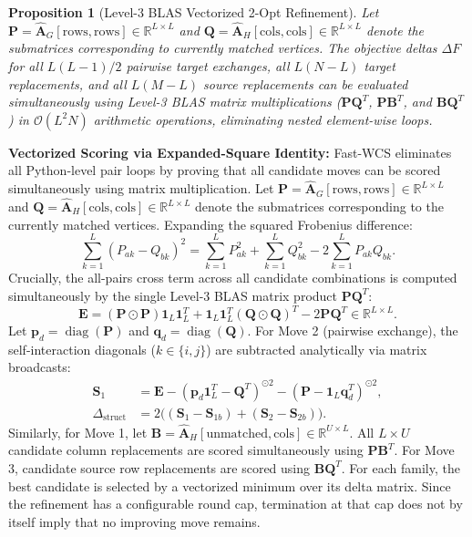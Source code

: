 \documentclass[conference]{IEEEtran}
\newtheorem{proposition}{Proposition}
\begin{document}
\begin{proposition}[Level-3 BLAS Vectorized 2-Opt Refinement]
\label{prop:2opt}
Let $\mathbf{P} = \hat{\mathbf{A}}_G[\mathrm{rows}, \mathrm{rows}] \in \mathbb{R}^{L \times L}$ and $\mathbf{Q} = \hat{\mathbf{A}}_H[\mathrm{cols}, \mathrm{cols}] \in \mathbb{R}^{L \times L}$ denote the submatrices corresponding to currently matched vertices. The objective deltas $\Delta F$ for all $L(L-1)/2$ pairwise target exchanges, all $L(N-L)$ target replacements, and all $L(M-L)$ source replacements can be evaluated simultaneously using Level-3 BLAS matrix multiplications ($\mathbf{P}\mathbf{Q}^T$, $\mathbf{P}\mathbf{B}^T$, and $\mathbf{B}\mathbf{Q}^T$) in $\mathcal{O}(L^2 N)$ arithmetic operations, eliminating nested element-wise loops.
\end{proposition}

\noindent\textbf{Vectorized Scoring via Expanded-Square Identity:} Fast-WCS eliminates all Python-level pair loops by proving that all candidate moves can be scored simultaneously using matrix multiplication. Let $\mathbf{P} = \hat{\mathbf{A}}_G[\text{rows}, \text{rows}] \in \mathbb{R}^{L \times L}$ and $\mathbf{Q} = \hat{\mathbf{A}}_H[\text{cols}, \text{cols}] \in \mathbb{R}^{L \times L}$ denote the submatrices corresponding to the currently matched vertices. Expanding the squared Frobenius difference:
\begin{equation}
\sum_{k=1}^L (P_{ak} - Q_{bk})^2 = \sum_{k=1}^L P_{ak}^2 + \sum_{k=1}^L Q_{bk}^2 - 2 \sum_{k=1}^L P_{ak} Q_{bk}.
\end{equation}
Crucially, the all-pairs cross term across all candidate combinations is computed simultaneously by the single Level-3 BLAS matrix product $\mathbf{P}\mathbf{Q}^T$:
\begin{equation}
\mathbf{E} = (\mathbf{P} \odot \mathbf{P})\mathbf{1}_L \mathbf{1}_L^T + \mathbf{1}_L \mathbf{1}_L^T (\mathbf{Q} \odot \mathbf{Q})^T - 2 \mathbf{P}\mathbf{Q}^T \in \mathbb{R}^{L \times L}.
\end{equation}
Let $\mathbf{p}_d = \operatorname{diag}(\mathbf{P})$ and $\mathbf{q}_d = \operatorname{diag}(\mathbf{Q})$. For Move 2 (pairwise exchange), the self-interaction diagonals ($k \in \{i, j\}$) are subtracted analytically via matrix broadcasts:
\begin{align}
\mathbf{S}_1 &= \mathbf{E} - (\mathbf{p}_d\mathbf{1}_L^T - \mathbf{Q}^T)^{\odot 2} - (\mathbf{P} - \mathbf{1}_L\mathbf{q}_d^T)^{\odot 2}, \\
\Delta_{\text{struct}} &= 2\big( (\mathbf{S}_1 - \mathbf{S}_{1b}) + (\mathbf{S}_2 - \mathbf{S}_{2b}) \big).
\end{align}
Similarly, for Move 1, let $\mathbf{B} = \hat{\mathbf{A}}_H[\text{unmatched}, \text{cols}] \in \mathbb{R}^{U \times L}$. All $L \times U$ candidate column replacements are scored simultaneously using $\mathbf{P}\mathbf{B}^T$. For Move 3, candidate source row replacements are scored using $\mathbf{B}\mathbf{Q}^T$.
For each family, the best candidate is selected by a vectorized minimum over its delta matrix. Since the refinement has a configurable round cap, termination at that cap does not by itself imply that no improving move remains.
\end{document}
